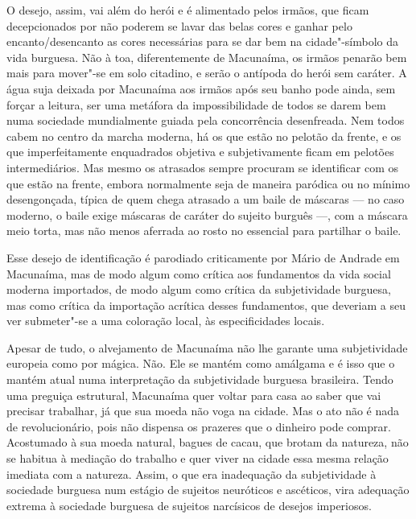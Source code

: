 O desejo, assim, vai além do herói e é alimentado pelos irmãos, que
ficam decepcionados por não poderem se lavar das belas cores e ganhar
pelo encanto/desencanto as cores necessárias para se dar bem na
cidade"-símbolo da vida burguesa. Não à toa, diferentemente de Macunaíma,
os irmãos penarão bem mais para mover"-se em solo citadino, e serão o
antípoda do herói sem caráter. A água suja deixada por Macunaíma aos
irmãos após seu banho pode ainda, sem forçar a leitura, ser uma metáfora
da impossibilidade de todos se darem bem numa sociedade mundialmente
guiada pela concorrência desenfreada. Nem todos cabem no centro da
marcha moderna, há os que estão no pelotão da frente, e os que
imperfeitamente enquadrados objetiva e subjetivamente ficam em pelotões
intermediários. Mas mesmo os atrasados sempre procuram se identificar
com os que estão na frente, embora normalmente seja de maneira paródica
ou no mínimo desengonçada, típica de quem chega atrasado a um baile de
máscaras --- no caso moderno, o baile exige máscaras de caráter do
sujeito burguês ---, com a máscara meio torta, mas não menos aferrada ao
rosto no essencial para partilhar o baile.

Esse desejo de identificação é parodiado criticamente por Mário de
Andrade em Macunaíma, mas de modo algum como crítica aos fundamentos da
vida social moderna importados, de modo algum como crítica da
subjetividade burguesa, mas como crítica da importação acrítica desses
fundamentos, que deveriam a seu ver submeter"-se a uma coloração local,
às especificidades locais.

Apesar de tudo, o alvejamento de Macunaíma não lhe garante uma
subjetividade europeia como por mágica. Não. Ele se mantém como amálgama
e é isso que o mantém atual numa interpretação da subjetividade burguesa
brasileira. Tendo uma preguiça estrutural, Macunaíma quer voltar para
casa ao saber que vai precisar trabalhar, já que sua moeda não voga na
cidade. Mas o ato não é nada de revolucionário, pois não dispensa os
prazeres que o dinheiro pode comprar. Acostumado à sua moeda natural,
bagues de cacau, que brotam da natureza, não se habitua à mediação do
trabalho e quer viver na cidade essa mesma relação imediata com a
natureza. Assim, o que era inadequação da subjetividade à sociedade
burguesa num estágio de sujeitos neuróticos e ascéticos, vira adequação
extrema à sociedade burguesa de sujeitos narcísicos de desejos
imperiosos.

